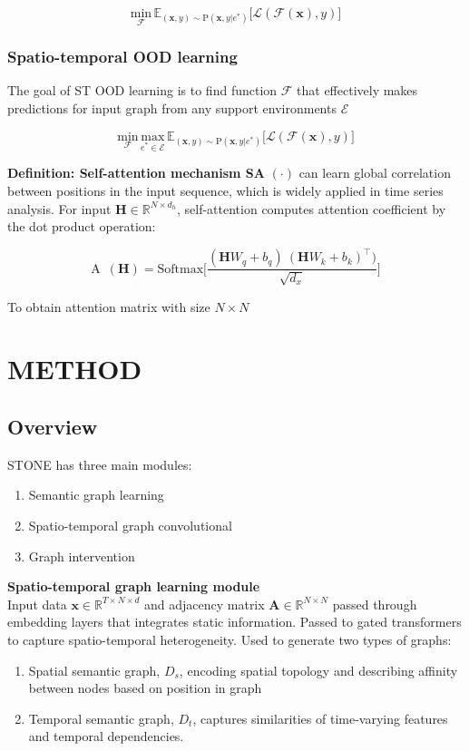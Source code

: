 \documentclass[11pt]{article}
\begin{document}
\[
\underset{\mathcal{F}}{\text{min}}\,\mathbb{E}_{(\mathbf{x}, y)\sim\text{P}(\mathbf{x},y\vert e^*)}\big[ \mathcal{L}(\mathcal{F}(\mathbf{x}),y) \big]
\]

\subsubsection{Spatio-temporal OOD learning}
The goal of ST OOD learning is to find function $\mathcal{F}$ that effectively makes predictions for input graph from any support environments $\mathcal{E}$

\[
  \underset{\mathcal{F}}{\text{min}}\,\underset{e^*\in\mathcal{E}}{\text{max}}\,\mathbb{E}_{(\mathbf{x}, y)\sim\text{P}(\mathbf{x},y\vert e^*)}\big[ \mathcal{L}(\mathcal{F}(\mathbf{x}),y) \big]
\]

\textbf{Definition: Self-attention mechanism SA} $(\cdot)$ can learn global correlation between positions in the input sequence, which is widely applied in time series analysis. For input $\mathbf{H}\in\mathbb{R}^{N\times d_h}$, self-attention computes attention coefficient by the dot product operation:

\[
  \text{A}\enspace (\mathbf{H})=\text{Softmax}\Bigg[ \frac{(\mathbf{H}W_q+b_q)\:(\mathbf{H}W_k+b_k)^\top)}{\sqrt{d_x}} \Bigg]
\]

To obtain attention matrix with size $N\times N$

\section{METHOD}

\subsection{Overview}
STONE has three main modules:
\begin{enumerate}
  \item Semantic graph learning
  \item Spatio-temporal graph convolutional
  \item Graph intervention
\end{enumerate}

\textbf{Spatio-temporal graph learning module}\\
\noindent Input data $\mathbf{x}\in\mathbb{R}^{T\times N \times d}$ and adjacency matrix $\mathbf{A}\in\mathbb{R}^{N\times N}$ passed through embedding layers that integrates static information. Passed to gated transformers to capture spatio-temporal heterogeneity. Used to generate two types of graphs:
\begin{enumerate}
  \item Spatial semantic graph, $D_s$, encoding spatial topology and describing affinity between nodes based on position in graph
  \item Temporal semantic graph, $D_t$, captures similarities of time-varying features and temporal dependencies.
\end{enumerate}
\end{document}
